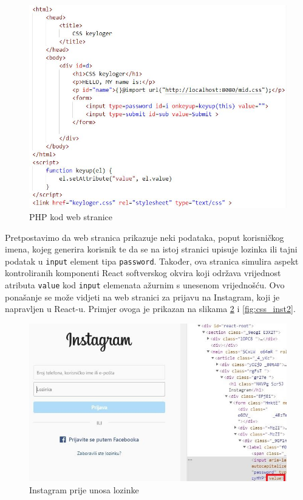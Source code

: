 \documentclass[12pt, oneside, onecolumn]{book}
\begin{document}
{\begin{figure}[H]
	\begin{center}
		\includegraphics[width=\textwidth]{css_cod.jpg}
		\caption{PHP kod web stranice} \label{fig:css_cod}
	\end{center}
\end{figure}

Pretpostavimo da web stranica prikazuje neki podataka, poput korisničkog imena, kojeg generira korisnik te da se na istoj stranici upisuje lozinka ili tajni podatak u \texttt{input} element tipa \texttt{password}. Također, ova stranica simulira aspekt kontroliranih komponenti React softverskog okvira koji održava vrijednost atributa \texttt{value} kod \texttt{input} elemenata ažurnim s unesenom vrijednošću. Ovo ponašanje se može vidjeti na web stranici za prijavu na Instagram, koji je napravljen u React-u. Primjer ovoga je prikazan na slikama \ref{fig:css_inst} i \ref{fig:css_inst2}.

\begin{figure}[H]
	\begin{center}
		\includegraphics[width=\textwidth]{css_inst.jpg}
		\caption{Instagram prije unosa lozinke} \label{fig:css_inst}
	\end{center}
\end{figure}

}
\end{document}
